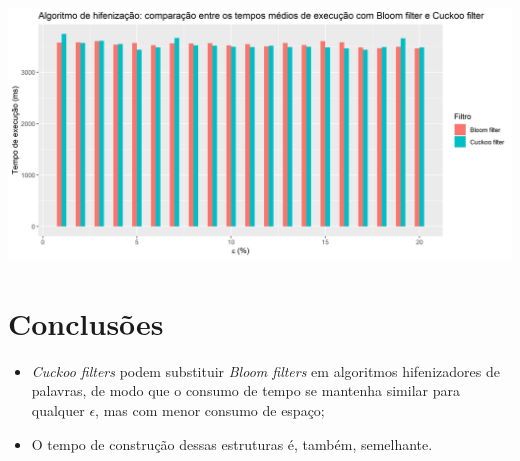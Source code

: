\documentclass[portrait]{ppgcaposter}
\begin{document}
\begin{multicols}{2}
\begin{center}\vspace{1cm}
    \includegraphics[width=0.9\linewidth]{cuckoo-bloom-comparison.png}
\end{center}\vspace{1cm}

\section{Conclusões}

\begin{itemize}
\item \textit{Cuckoo filters} podem substituir \textit{Bloom filters} em algoritmos hifenizadores de palavras, de modo que o consumo de tempo se mantenha similar para qualquer $\epsilon$, mas com menor consumo de espaço;
\item O tempo de construção dessas estruturas é, também, semelhante.
\end{itemize}


\end{multicols}
\end{document}

